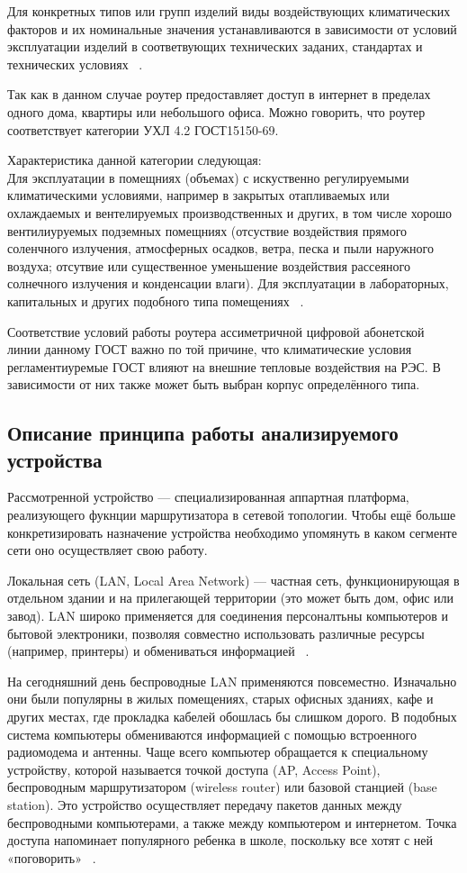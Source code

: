 Для конкретных типов или групп изделий виды воздействующих
климатических факторов и их номинальные значения устанавливаются в
зависимости от условий эксплуатации изделий в соответвующих
технических заданих, стандартах и технических условиях ~\cite{GOST_15150-69}.

Так как в данном случае роутер предоставляет доступ в интернет в
пределах одного дома, квартиры или небольшого офиса. Можно говорить, что роутер соответствует категории УХЛ 4.2 ГОСТ15150-69.

Характеристика данной категории следующая:\\
Для эксплуатации в помещниях (объемах) с искуственно регулируемыми
климатическими условиями, например в закрытых отапливаемых или
охлаждаемых и вентелируемых производственных и других, в том числе
хорошо вентилиуруемых подземных помещниях (отсуствие воздействия
прямого соленчного излучения, атмосферных осадков, ветра, песка и пыли
наружного воздуха; отсутвие или существенное уменьшение воздействия
рассеяного солнечного излучения и конденсации влаги). Для эксплуатации
в лабораторных, капитальных и других подобного типа помещениях ~\cite{GOST_15150-69}.

Соответствие условий работы роутера ассиметричной цифровой абонетской
линии данному ГОСТ важно по той причине, что климатические условия
регламентиуремые ГОСТ влияют на внешние тепловые воздействия на РЭС.
В зависимости от них также может быть выбран корпус определённого
типа.

\subsection{Описание принципа работы анализируемого устройства}


Рассмотренной устройство — специализированная аппартная платформа,
реализующего фукнции маршрутизатора в сетевой топологии.  Чтобы ещё
больше конкретизировать назначение устройства необходимо упомянуть в
каком сегменте сети оно осуществляет свою работу.


Локальная сеть (LAN, Local Area Network) — частная сеть,
функционирующая в отдельном здании и на прилегающей территории
(это может быть дом, офис или завод). LAN широко применяется для соединения персоналтьны компьютеров и бытовой электроники, позволяя совместно
использовать различные ресурсы (например, принтеры) и обмениваться
информацией ~\cite{NetworksTanenbaum2023}.

На сегодняшний день беспроводные LAN применяются
повсеместно. Изначально они были популярны в жилых помещениях, старых
офисных зданиях, кафе и других местах, где прокладка кабелей обошлась
бы слишком дорого. В подобных система компьютеры обмениваются
информацией с помощью встроенного радиомодема и антенны. Чаще всего
компьютер обращается к специальному устройству, которой называется
точкой доступа (AP, Access Point), беспроводным маршрутизатором
(wireless router) или базовой станцией (base station). Это устройство
осуществляет передачу пакетов данных между беспроводными компьютерами,
а также между компьютером и интернетом. Точка доступа напоминает
популярного ребенка в школе, поскольку все хотят с ней «поговорить»
~\cite{NetworksTanenbaum2023}.

